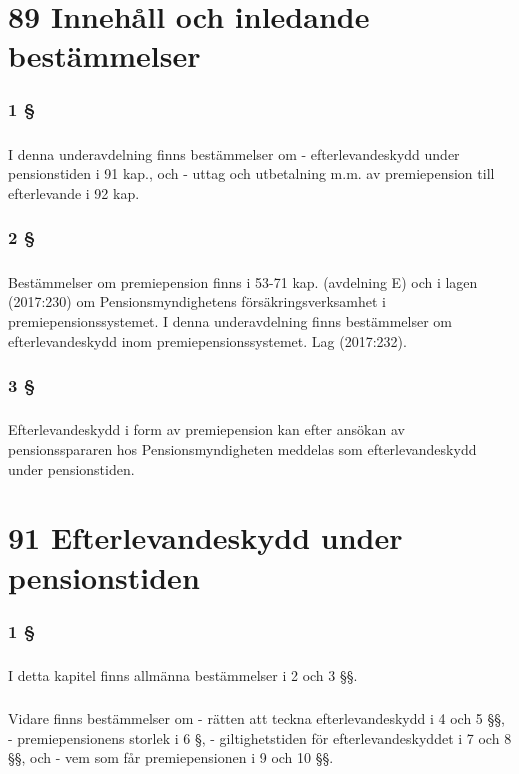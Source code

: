 \documentclass[a4paper,notitlepage,openany,10pt]{book}
\begin{document}
\chapter*{89 Innehåll och inledande bestämmelser}
\subsection*{1 §}
\paragraph*{}
I denna underavdelning finns bestämmelser om
\newline - efterlevandeskydd under pensionstiden i 91 kap., och
\newline - uttag och utbetalning m.m. av premiepension till efterlevande i 92 kap.
\subsection*{2 §}
\paragraph*{}
Bestämmelser om premiepension finns i 53-71 kap. (avdelning E) och i lagen (2017:230) om Pensionsmyndighetens försäkringsverksamhet i premiepensionssystemet. I denna underavdelning finns bestämmelser om efterlevandeskydd inom premiepensionssystemet.
Lag (2017:232).
\subsection*{3 §}
\paragraph*{}
Efterlevandeskydd i form av premiepension kan efter ansökan av pensionsspararen hos Pensionsmyndigheten meddelas som efterlevandeskydd under pensionstiden.
\chapter*{91 Efterlevandeskydd under pensionstiden}
\subsection*{1 §}
\paragraph*{}
I detta kapitel finns allmänna bestämmelser i 2 och 3 §§.
\paragraph*{}
Vidare finns bestämmelser om
\newline - rätten att teckna efterlevandeskydd i 4 och 5 §§,
\newline - premiepensionens storlek i 6 §,
\newline - giltighetstiden för efterlevandeskyddet i 7 och 8 §§, och
\newline - vem som får premiepensionen i 9 och 10 §§.
\end{document}
